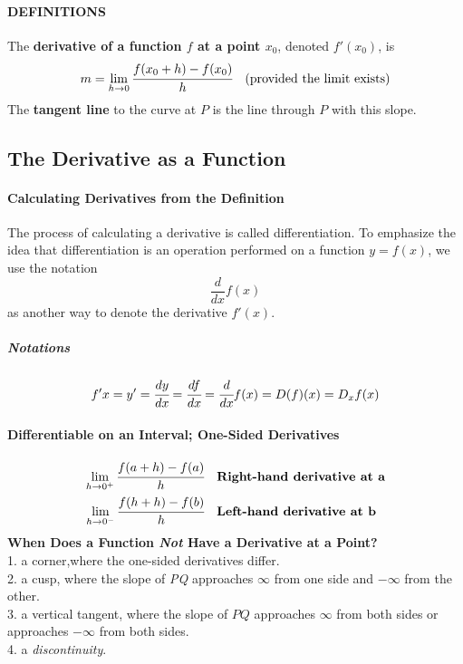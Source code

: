 \documentclass{article}
\begin{document}
            \paragraph{DEFINITIONS} The \textbf{derivative of a function $f$ at a point $x_0$}, denoted $f'(x_0)$, is 
            \[m=\lim\limits_{h\to 0}\cfrac{f(x_0+h)-f(x_0)}{h}\quad\text{(provided the limit exists)}\]
            The \textbf{tangent line} to the curve at $P$ is the line through $P$ with this slope.
        \subsection{The Derivative as a Function}
            \paragraph{Calculating Derivatives from the Definition}
            The process of calculating a derivative is called differentiation. To emphasize the idea that differentiation is an operation performed on a function $y=f(x)$, we use the notation
            \[\frac{d}{dx}f(x)\]
            as another way to denote the derivative $f'(x)$.
            \subparagraph{Notations}
            \[f'{x}=y'=\cfrac{dy}{dx}=\cfrac{df}{dx}=\cfrac{d}{dx}f(x)=D(f)(x)=D_x f(x)\]
            \paragraph{Differentiable on an Interval; One-Sided Derivatives}
            \begin{equation}
                \begin{aligned}
                    \lim\limits_{h\to 0^+}\cfrac{f(a+h)-f(a)}{h}\quad&\textbf{Right-hand derivative at a}\\
                    \lim\limits_{h\to 0^-}\cfrac{f(h+h)-f(b)}{h}\quad&\textbf{Left-hand derivative at b}
                \end{aligned}  
            \end{equation}
            \textbf{When Does a Function \textit{Not} Have a Derivative at a Point?}\\
            1. a corner,where the one-sided derivatives differ.\\
            2. a cusp, where the slope of \textit{PQ} approaches $\infty$ from one side and $-\infty$ from the other.\\
            3. a vertical tangent, where the slope of $PQ$ approaches $\infty$ from both sides or approaches $-\infty$ from both sides.\\
            4. a \textit{discontinuity}.
\end{document}

